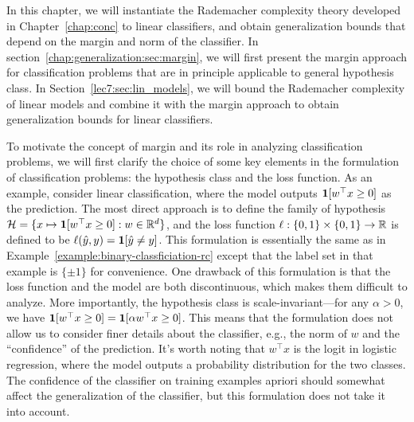 


In this chapter, we will instantiate the Rademacher complexity theory developed in Chapter~\ref{chap:conc} to linear classifiers, and obtain generalization bounds that depend on the margin and norm of the classifier.  In section~\ref{chap:generalization:sec:margin}, we will first present the margin approach for classification problems that are in principle applicable to general hypothesis class. In Section~\ref{lec7:sec:lin_models}, we will bound the Rademacher complexity of linear models and combine it with the margin approach to obtain generalization bounds for linear classifiers.

 \label{chap:generalization:sec:margin}

To motivate the concept of margin and its role in analyzing classification problems, we will first clarify the choice of some key elements in the formulation of classification problems: the hypothesis class and the loss function. 
	As an example, consider linear classification, where the model outputs $\mathbf{1}[w^\top x \ge 0]$ as the prediction. The most direct approach is to define the family of hypothesis $\mathcal H = \{x\mapsto \mathbf{1}[w^\top x \ge 0]: w\in \mathbb R^d\}$, and the loss function $\ell: \{0, 1\}\times \{0, 1\}\rightarrow \mathbb R$ is defined to be $\ell(\hat{y}, y) =\mathbf{1}[\hat{y} \neq y]$. This formulation is essentially the same as in Example~\ref{example:binary-classficiation-rc} except that the label set in that example is  $\{\pm 1\}$ for convenience. One drawback of this formulation is that  the loss function and the model are both discontinuous, which makes them difficult to analyze. More importantly, the hypothesis class is scale-invariant---for any $\alpha> 0$, we have $\mathbf{1}[w^\top x \ge 0] = \mathbf{1}[\alpha w^\top x \ge 0]$. This means that the formulation does not allow us to consider finer details about the classifier, e.g., the norm of $w$ and the ``confidence'' of the prediction. It's worth noting that $w^\top x$ is the logit in logistic regression, where the model outputs a probability distribution for the two classes. The confidence of the classifier on training examples apriori should somewhat affect the generalization of the classifier, but this formulation does not take it into account.

